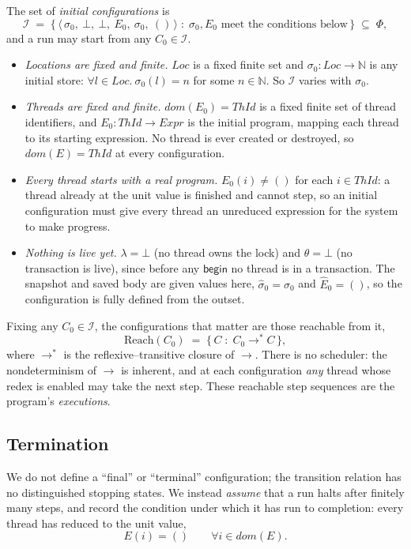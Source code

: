 \documentclass[manuscript,nonacm]{acmart}
\theoremstyle{acmdefinition}
\newcommand{\Loc}{\mathit{Loc}}
\newcommand{\ThId}{\mathit{ThId}}   %
\newcommand{\Expr}{\mathit{Expr}}
\newcommand{\unit}{()}
\newcommand{\bbegin}{\textsf{begin}}
\begin{document}
The set of \emph{initial configurations} is
\[
\mathcal{I} \;=\;
\bigl\{\, \langle\, \sigma_0,\ \bot,\ \bot,\ E_0,\ \sigma_0,\ \unit \,\rangle
\;:\; \sigma_0, E_0 \text{ meet the conditions below} \,\bigr\}
\;\subseteq\; \Phi ,
\]
and a run may start from any $C_0 \in \mathcal{I}$.
\begin{itemize}
\item \emph{Locations are fixed and finite.} $\Loc$ is a fixed finite set and
$\sigma_0 : \Loc \rightarrow \mathbb{N}$ is any initial store: $\forall l \in \Loc.\
\sigma_0(l) = n$ for some $n \in \mathbb{N}$. So $\mathcal{I}$ varies with $\sigma_0$.
\item \emph{Threads are fixed and finite.} $dom(E_0) = \ThId$ is a fixed finite set
of thread identifiers, and $E_0 : \ThId \rightarrow \Expr$ is the initial program,
mapping each thread to its starting expression. No thread is ever created or
destroyed, so $dom(E) = \ThId$ at every configuration.
\item \emph{Every thread starts with a real program.} $E_0(i) \neq \unit$ for each
$i \in \ThId$: a thread already at the unit value is finished and cannot step, so an
initial configuration must give every thread an unreduced expression for the system
to make progress.
\item \emph{Nothing is live yet.} $\lambda = \bot$ (no thread owns the lock) and
$\theta = \bot$ (no transaction is live), since before any $\bbegin$ no thread is in
a transaction. The snapshot and saved body are given values here,
$\hat{\sigma}_0 = \sigma_0$ and $\hat{E}_0 = \unit$, so the configuration is fully
defined from the outset.
\end{itemize}

Fixing any $C_0 \in \mathcal{I}$, the configurations that matter are those
reachable from it,
\[
\mathrm{Reach}(C_0) \;=\; \{\, C \;:\; C_0 \rightarrow^{*} C \,\},
\]
where $\rightarrow^{*}$ is the reflexive--transitive closure of $\rightarrow$.
There is no scheduler: the nondeterminism of $\rightarrow$ is inherent, and at each
configuration \emph{any} thread whose redex is enabled may take the next step.
These reachable step sequences are the program's \emph{executions}.


\subsection{Termination}

We do not define a ``final'' or ``terminal'' configuration; the transition
relation has no distinguished stopping states. We instead \emph{assume} that a run
halts after finitely many steps, and record the condition under which it has run
to completion: every thread has reduced to the unit value,
\[
E(i) = \unit \qquad \forall i \in dom(E).
\]
\end{document}
